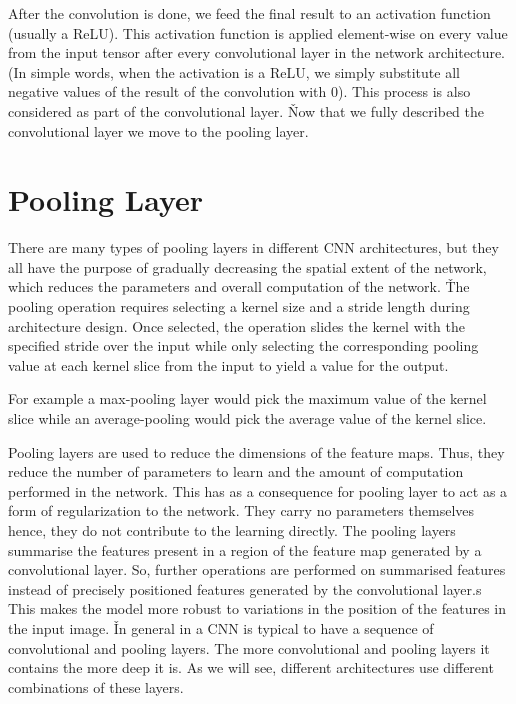 After the convolution is done, we feed the final result to an activation function (usually a ReLU). This activation
function is applied element-wise on every value from the input tensor after every convolutional layer in the network
architecture. (In simple words, when the activation is a ReLU, we simply substitute all negative values of the result
of the convolution with 0). This process is also considered as part of the convolutional layer. \v

Now that we fully described the convolutional layer we move to the pooling layer.

\section{Pooling Layer}

There are many types of pooling layers in different CNN architectures, but they all have the purpose of gradually
decreasing the spatial extent of the network, which reduces the parameters and overall computation of the network. \v

The pooling operation requires selecting a kernel size and a stride length during architecture design. Once selected,
the operation slides the kernel with the specified stride over the input while only selecting the corresponding
pooling value at each kernel slice from the input to yield a value for the output.

\be
For example a max-pooling layer would pick the maximum value of the kernel slice while an average-pooling would pick
the average value of the kernel slice.

\ee

Pooling layers are used to reduce the dimensions of the feature maps. Thus, they reduce the number of parameters to
learn and the amount of computation performed in the network. This has as a consequence for pooling layer to act as a
form of regularization to the network. They carry no parameters themselves hence, they do not contribute to the
learning directly. The pooling layers summarise the features present in a region of the feature map generated by a
convolutional layer. So, further operations are performed on summarised features instead of precisely positioned
features generated by the convolutional layer.s This makes the model more robust to variations in the position of the
features in the input image. \v

In general in a CNN is typical to have a sequence of convolutional and pooling layers. The more convolutional and
pooling layers it contains the more deep it is. As we will see, different architectures use different combinations of
these layers.

